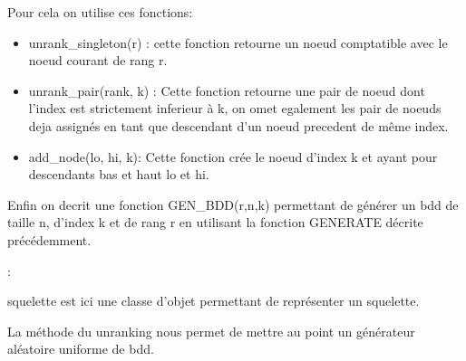 \documentclass[french]{article}
\begin{document}
Pour cela on utilise ces fonctions:
\begin{itemize}
    \item unrank\_singleton(r) : cette fonction retourne un noeud comptatible avec le noeud courant de rang r.
    \item unrank\_pair(rank, k) : Cette fonction retourne une pair de noeud dont l'index est strictement inferieur à k, on omet egalement les pair de noeuds deja assignés en tant que descendant d'un noeud precedent de même index.
    
    \item add\_node(lo, hi, k): Cette fonction crée le noeud d'index k et ayant pour descendants bas et haut lo et hi.
\end{itemize}

\newpage
Enfin on decrit une fonction GEN\_BDD(r,n,k) permettant de générer un bdd de taille n, d'index k et de rang r en utilisant la fonction GENERATE décrite précédemment.

\begin{algorithm}
  \begin{algorithmic}[1]
    \Statex
            \State {}
            \State {}
            \State {}
            \State {}
            \State {}
                \State {}
                :
                    \State {}
                    \State {}
                    \State {}
            \EndFor
  \end{algorithmic}
\end{algorithm}

squelette est ici une classe d'objet permettant de représenter un squelette.

La méthode du unranking nous permet de mettre au point un générateur aléatoire uniforme de bdd.
\end{document}
